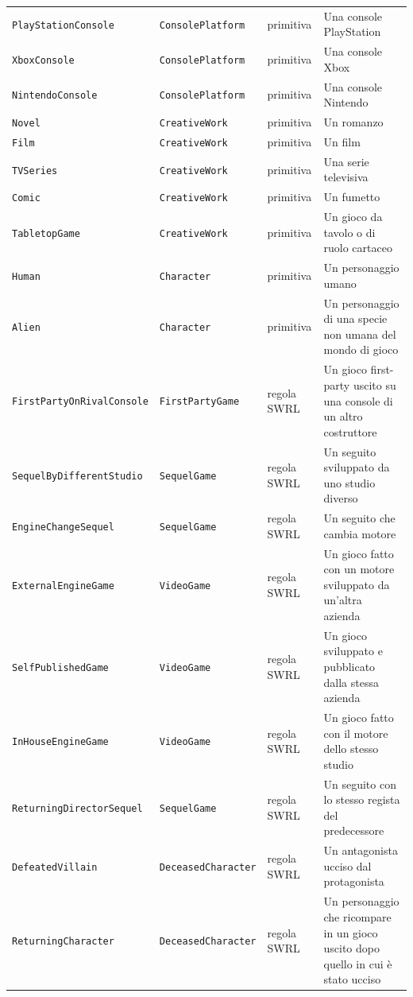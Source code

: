 \begin{longtable}{lllp{5.8cm}}
\texttt{PlayStationConsole} & \texttt{ConsolePlatform} & primitiva & Una console PlayStation \\
\texttt{XboxConsole} & \texttt{ConsolePlatform} & primitiva & Una console Xbox \\
\texttt{NintendoConsole} & \texttt{ConsolePlatform} & primitiva & Una console Nintendo \\
\texttt{Novel} & \texttt{CreativeWork} & primitiva & Un romanzo \\
\texttt{Film} & \texttt{CreativeWork} & primitiva & Un film \\
\texttt{TVSeries} & \texttt{CreativeWork} & primitiva & Una serie televisiva \\
\texttt{Comic} & \texttt{CreativeWork} & primitiva & Un fumetto \\
\texttt{TabletopGame} & \texttt{CreativeWork} & primitiva & Un gioco da tavolo o di ruolo cartaceo \\
\texttt{Human} & \texttt{Character} & primitiva & Un personaggio umano \\
\texttt{Alien} & \texttt{Character} & primitiva & Un personaggio di una specie non umana del mondo di gioco \\
\texttt{FirstPartyOnRivalConsole} & \texttt{FirstPartyGame} & regola SWRL & Un gioco first-party uscito su una console di un altro costruttore \\
\texttt{SequelByDifferentStudio} & \texttt{SequelGame} & regola SWRL & Un seguito sviluppato da uno studio diverso \\
\texttt{EngineChangeSequel} & \texttt{SequelGame} & regola SWRL & Un seguito che cambia motore \\
\texttt{ExternalEngineGame} & \texttt{VideoGame} & regola SWRL & Un gioco fatto con un motore sviluppato da un'altra azienda \\
\texttt{SelfPublishedGame} & \texttt{VideoGame} & regola SWRL & Un gioco sviluppato e pubblicato dalla stessa azienda \\
\texttt{InHouseEngineGame} & \texttt{VideoGame} & regola SWRL & Un gioco fatto con il motore dello stesso studio \\
\texttt{ReturningDirectorSequel} & \texttt{SequelGame} & regola SWRL & Un seguito con lo stesso regista del predecessore \\
\texttt{DefeatedVillain} & \texttt{DeceasedCharacter} & regola SWRL & Un antagonista ucciso dal protagonista \\
\texttt{ReturningCharacter} & \texttt{DeceasedCharacter} & regola SWRL & Un personaggio che ricompare in un gioco uscito dopo quello in cui è stato ucciso \\

\end{longtable}
